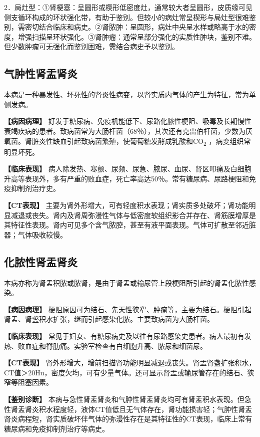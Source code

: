 2．局灶型：①肾梗塞：呈圆形或楔形低密度灶，通常较大者呈圆形，皮质缘可见侧支循环构成的环状强化带，有助于鉴别。但较小的病灶常呈楔形与局灶型很难鉴别，需密切结合临床和病史。②肾脓肿：呈圆形，病灶中央呈水样或略高于水的密度，增强扫描呈环状强化。③肾肿瘤：通常呈部分强化的实质性肿块，鉴别不难。但少数肿瘤可无强化而鉴别困难，需结合病史予以鉴别。

\subsection{气肿性肾盂肾炎}

本病是一种暴发性、坏死性的肾炎性病变，以肾实质内气体的产生为特征，常为单侧发病。

\textbf{【病因病理】}
好发于糖尿病、免疫机能低下、尿路化脓性梗阻、吸毒及长期慢性衰竭疾病的患者。致病菌常为大肠杆菌（68％），其次还有克雷伯杆菌，少数为厌氧菌。肾脏炎性缺血引起致病菌繁殖，使葡萄糖发酵成乳酸和CO\textsubscript{2}
，病变组织常明显坏死。

\textbf{【临床表现】}
病人除发热、寒颤、尿频、尿急、脓尿、血尿、肾区叩痛及白细胞升高等表现外，多有严重的败血症，死亡率高达50％。常有糖尿病、尿路梗阻和免疫抑制剂治疗史。

\textbf{【CT表现】}
主要为肾外形增大，可有轻度积水表现；肾实质多处破坏；肾功能明显减退或丧失。肾内及肾周弥漫性气体与低密度软组织影合并存在、肾筋膜增厚是其特征性表现。肾内可见多个含气脓腔，甚至有液平面表现。气体可扩散至邻近脏器；气体吸收较慢。

\subsection{化脓性肾盂肾炎}

本病亦称为肾盂积脓或脓肾，是由于肾盂或输尿管上段梗阻所引起的肾盂化脓性感染。

\textbf{【病因病理】}
梗阻原因可为结石、先天性狭窄、肿瘤等，主要为结石。梗阻引起肾盂、肾盏积水扩张，继而引起感染化脓。主要致病菌为大肠杆菌。

\textbf{【临床表现】}
常见于妇女、有糖尿病史及以往有尿路感染史患者。病人最初有发热、败血症和脊肋痛。实验室检查有白细胞升高、脓尿和细菌尿。

\textbf{【CT表现】}
肾外形增大，增前扫描肾功能明显减退或丧失。肾盂肾盏扩张积水，CT值＞20Hu，密度欠均，可有少量气体。还可显示肾盂或输尿管存在的结石、狭窄等阻塞因素。

\textbf{【鉴别诊断】}
本病与急性肾盂肾炎和气肿性肾盂肾炎均可有肾盂积水表现。但急性肾盂肾炎积水程度轻，液体CT值低且无气体存在，肾功能损害轻；气肿性肾盂肾炎病程短，肾实质破坏伴气体的弥漫性存在是其特征性的CT表现，临床上常有糖尿病和免疫抑制剂治疗等病史。

